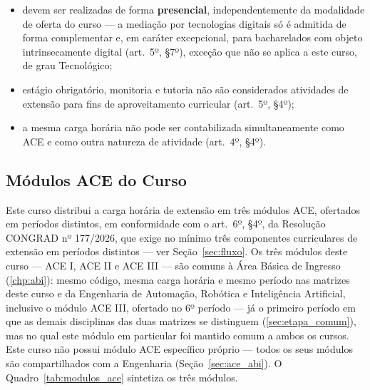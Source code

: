\begin{itemize}
    \item devem ser realizadas de forma \textbf{presencial}, independentemente da modalidade de oferta do curso — a mediação por tecnologias digitais só é admitida de forma complementar e, em caráter excepcional, para bacharelados com objeto intrinsecamente digital (art.\ 5º, §7º), exceção que não se aplica a este curso, de grau Tecnológico;
    \item estágio obrigatório, monitoria e tutoria não são considerados atividades de extensão para fins de aproveitamento curricular (art.\ 5º, §4º);
    \item a mesma carga horária não pode ser contabilizada simultaneamente como ACE e como outra natureza de atividade (art.\ 4º, §4º).
\end{itemize}

\subsection{Módulos ACE do Curso}
\label{sec:ace_modulos}

Este curso distribui a carga horária de extensão em três módulos ACE, ofertados em períodos distintos, em conformidade com o art.\ 6º, §4º, da Resolução CONGRAD nº 177/2026, que exige no mínimo três componentes curriculares de extensão em períodos distintos — ver Seção~\ref{sec:fluxo}. Os três módulos deste curso — ACE I, ACE II e ACE III — são comuns à Área Básica de Ingresso (\autoref{chp:abi}): mesmo código, mesma carga horária e mesmo período nas matrizes deste curso e da Engenharia de Automação, Robótica e Inteligência Artificial, inclusive o módulo ACE III, ofertado no 6º período — já o primeiro período em que as demais disciplinas das duas matrizes se distinguem (\autoref{sec:etapa_comum}), mas no qual este módulo em particular foi mantido comum a ambos os cursos. Este curso não possui módulo ACE específico próprio — todos os seus módulos são compartilhados com a Engenharia (Seção~\ref{sec:ace_abi}). O Quadro~\ref{tab:modulos_ace} sintetiza os três módulos.

